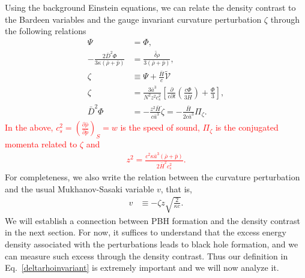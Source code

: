 \documentclass[a4paper,11pt]{article}
\newcommand{\dpar}[1]{\left(#1 \right)}
\begin{document}
Using the background Einstein equations, we can relate the density contrast to the Bardeen variables and the gauge invariant curvature perturbation $\zeta$ through the following relations~\cite{Mukhanov1992, Vitenti2013}
        \begin{align}
            \Psi&=\Phi,
		 \\
        \label{deltarho}
		 -\frac{2\bar{D}^2 \Phi}{3  \kappa (\bar{\rho}+\bar{p})}&=   \frac{{\tilde{\delta\rho}}} {3(\bar{\rho}+\bar{p})}
		,  
		 \\
        \label{vrelation}
		\zeta &\equiv \Psi  + \frac{\bar{H}}{c} \tilde{\mathcal{V}}
         \\
        \label{zeta2}
        \zeta &= \frac{3  \bar{a}^3}{N^2z^2 c_s^2 } \left[\frac{\partial}{c\partial t}\left(\frac{c\Phi }{3\bar{H}}\right) + \frac{\Phi}{3}\right]
        ,  \\
        \label{phiz}
        \bar{D}^{2} \Phi&=  - \frac{z^2\bar{H}}{c\bar{a}^3} \dot{\zeta} = -\frac{\bar{H}}{2c\bar{a}^3} \Pi_\zeta 
        .\end{align}
\textcolor{red}{In the above, $c^{2}_s=\dpar{ \frac{\partial\bar{\rho}}{\partial\bar{p}} }_{S}= w$ is the speed of sound, $\Pi_\zeta$ is the conjugated momenta related to $\zeta$ and 
\begin{align}
	\label{zdef}
	z^2=\frac{c^2 \kappa \bar{a}^3 (\bar{\rho} + \bar{p})}{2\bar{H}^2 c_{s}^2}
	.\end{align}}
For completeness, we also write the relation between the curvature perturbation and the usual Mukhanov-Sasaki variable $v$, that is,
\begin{align}
	\label{msv}
	v &\equiv - \zeta z \sqrt{\frac{2}{\kappa c}}
.\end{align}
We will establish a connection between PBH formation and the density contrast in the next section. For now, it suffices to understand that the excess energy density associated with the perturbations leads to black hole formation, and we can measure such excess through the density contrast. Thus our definition in Eq.~\eqref{deltarhoinvariant} is extremely important and we will now analyze it.
\end{document}
